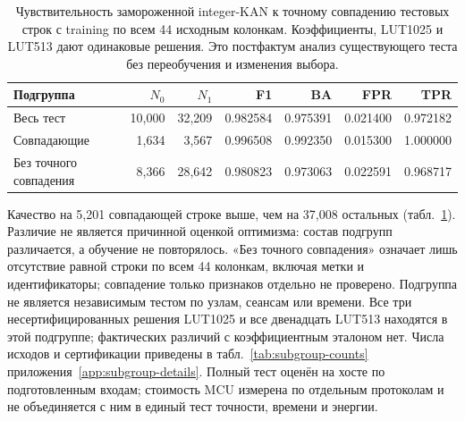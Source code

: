 \begin{table}[!htbp]
\centering\footnotesize\setlength{\tabcolsep}{4pt}
\caption{Чувствительность замороженной integer-KAN к точному совпадению тестовых строк с training по всем 44 исходным колонкам. Коэффициенты, LUT1025 и LUT513 дают одинаковые решения. Это постфактум анализ существующего теста без переобучения и изменения выбора.}
\label{tab:duplicate-sensitivity}
\begin{tabular}{lrrrrrr}
\toprule
Подгруппа & $N_0$ & $N_1$ & F1 & BA & FPR & TPR\\
\midrule
Весь тест & 10,000 & 32,209 & 0.982584 & 0.975391 & 0.021400 & 0.972182\\
Совпадающие & 1,634 & 3,567 & 0.996508 & 0.992350 & 0.015300 & 1.000000\\
Без точного совпадения & 8,366 & 28,642 & 0.980823 & 0.973063 & 0.022591 & 0.968717\\
\bottomrule
\end{tabular}
\end{table}

Качество на 5,201 совпадающей строке выше, чем на 37,008 остальных (табл.~\ref{tab:duplicate-sensitivity}). Различие не является причинной оценкой оптимизма: состав подгрупп различается, а обучение не повторялось. «Без точного совпадения» означает лишь отсутствие равной строки по всем 44 колонкам, включая метки и идентификаторы; совпадение только признаков отдельно не проверено. Подгруппа не является независимым тестом по узлам, сеансам или времени. Все три несертифицированных решения LUT1025 и все двенадцать LUT513 находятся в этой подгруппе; фактических различий с коэффициентным эталоном нет. Числа исходов и сертификации приведены в табл.~\ref{tab:subgroup-counts} приложения~\ref{app:subgroup-details}. Полный тест оценён на хосте по подготовленным входам; стоимость MCU измерена по отдельным протоколам и не объединяется с ним в единый тест точности, времени и энергии.

